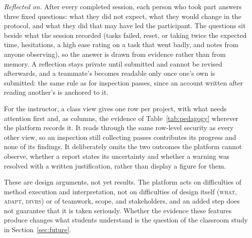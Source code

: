 \documentclass[conference]{IEEEtran}
\begin{document}
\emph{Reflected on.} After every completed session, each person who took
part answers three fixed questions: what they did not expect, what they
would change in the protocol, and what they did that may have led the
participant. The questions sit beside what the session recorded (tasks
failed, reset, or taking twice the expected time, hesitations, a high ease
rating on a task that went badly, and notes from anyone observing), so the
answer is drawn from evidence rather than from memory. A reflection stays
private until submitted and cannot be revised afterwards, and a teammate's
becomes readable only once one's own is submitted: the same rule as for
inspection passes, since an account written after reading another's is
anchored to it.

For the instructor, a class view gives one row per project, with what
needs attention first and, as columns, the evidence of
Table~\ref{tab:pedagogy} wherever the platform records it. It reads
through the same row-level security as every other view, so an inspection
still collecting passes contributes its progress and none of its findings.
It deliberately omits the two outcomes the platform cannot observe, whether
a report states its uncertainty and whether a warning was resolved with a
written justification, rather than display a figure for them.

These are design arguments, not yet results. The platform acts on
difficulties of method execution and interpretation, not on difficulties
of design itself (\textsc{what}, \textsc{adapt}, \textsc{divrs}) or of
teamwork, scope, and stakeholders, and an added step does not guarantee
that it is taken seriously. Whether the evidence these features produce
changes what students understand is the question of the classroom study in
Section~\ref{sec:future}.
\end{document}

